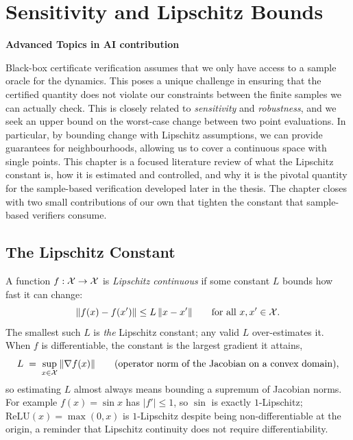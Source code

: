 \chapter{Sensitivity and Lipschitz Bounds}
\label{sec:lipschitz}

{\Large\bfseries Advanced Topics in AI contribution\par}
\medskip

Black-box certificate verification assumes that we only have access to a sample oracle for the dynamics. This poses a unique challenge in ensuring that the certified quantity does not violate our constraints between the finite samples we can actually check. This is closely related to \emph{sensitivity} and \emph{robustness}, and we seek an upper bound on the worst-case change between two point evaluations. In particular, by bounding change with Lipschitz assumptions, we can provide guarantees for neighbourhoods, allowing us to cover a continuous space with single points. This chapter is a focused literature review of what the Lipschitz constant is, how it is estimated and controlled, and why it is the pivotal quantity for the sample-based verification developed later in the thesis. The chapter closes with two small contributions of our own that tighten the constant that sample-based verifiers consume.

\section{The Lipschitz Constant}
\label{sec:whatislip}

A function $f : \mathcal{X} \to \mathcal{X}$ is \emph{Lipschitz continuous} if some constant $L$ bounds how fast it can change:
\begin{equation}
\label{lip_def}
    \| f(x) - f(x') \| \le L \, \| x - x' \|
    \qquad \text{for all } x, x' \in \mathcal{X}.
\end{equation}
The smallest such $L$ is \emph{the} Lipschitz constant; any valid $L$ over-estimates it. When $f$ is differentiable, the constant is the largest gradient it attains,
\begin{equation}
\label{gradient_lip}
    L \;=\; \sup_{x\in\mathcal{X}} \|\nabla f(x)\|
    \qquad\text{(operator norm of the Jacobian on a convex domain)},
\end{equation}
so estimating $L$ almost always means bounding a supremum of Jacobian norms. For example $f(x)=\sin x$ has $|f'|\le 1$, so $\sin$ is exactly $1$-Lipschitz; $\mathrm{ReLU}(x)=\max(0,x)$ is $1$-Lipschitz despite being non-differentiable at the origin, a reminder that Lipschitz continuity does not require differentiability.

